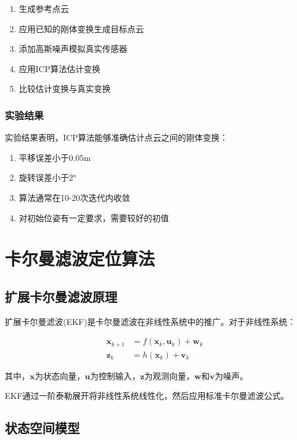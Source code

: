 \documentclass[12pt,a4paper]{report}
\begin{document}
\begin{enumerate}[itemsep=0pt]
    \item 生成参考点云
    \item 应用已知的刚体变换生成目标点云
    \item 添加高斯噪声模拟真实传感器
    \item 应用ICP算法估计变换
    \item 比较估计变换与真实变换
\end{enumerate}

\subsection{实验结果}

实验结果表明，ICP算法能够准确估计点云之间的刚体变换：

\begin{enumerate}[itemsep=0pt]
    \item 平移误差小于0.05m
    \item 旋转误差小于2°
    \item 算法通常在10-20次迭代内收敛
    \item 对初始位姿有一定要求，需要较好的初值
\end{enumerate}

\chapter{卡尔曼滤波定位算法}

\section{扩展卡尔曼滤波原理}

扩展卡尔曼滤波(EKF)是卡尔曼滤波在非线性系统中的推广。对于非线性系统：

\begin{align}
\mathbf{x}_{k+1} &= f(\mathbf{x}_k, \mathbf{u}_k) + \mathbf{w}_k \\
\mathbf{z}_k &= h(\mathbf{x}_k) + \mathbf{v}_k
\end{align}

其中，$\mathbf{x}$为状态向量，$\mathbf{u}$为控制输入，$\mathbf{z}$为观测向量，$\mathbf{w}$和$\mathbf{v}$为噪声。

EKF通过一阶泰勒展开将非线性系统线性化，然后应用标准卡尔曼滤波公式。

\section{状态空间模型}
\end{document}
